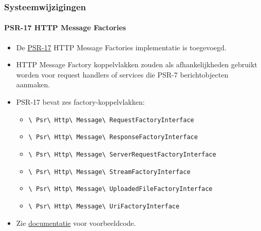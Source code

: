 
\begin{frame}[fragile]
	\frametitle{Systeemwijzigingen}
	\framesubtitle{PSR-17 HTTP Message Factories}

	\begin{itemize}
		\item De \href{https://www.php-fig.org/psr/psr-17/}{PSR-17}
			HTTP Message Factories implementatie is toegevoegd.
		\item HTTP Message Factory koppelvlakken zouden als afhankelijkheden gebruikt worden voor
			request handlers of services die PSR-7 berichtobjecten aanmaken.
		\item PSR-17 bevat zes factory-koppelvlakken:

			\begin{itemize}\smaller
				\item \texttt{\textbackslash
					Psr\textbackslash
					Http\textbackslash
					Message\textbackslash
					RequestFactoryInterface}
				\item \texttt{\textbackslash
					Psr\textbackslash
					Http\textbackslash
					Message\textbackslash
					ResponseFactoryInterface}
				\item \texttt{\textbackslash
					Psr\textbackslash
					Http\textbackslash
					Message\textbackslash
					ServerRequestFactoryInterface}
				\item \texttt{\textbackslash
					Psr\textbackslash
					Http\textbackslash
					Message\textbackslash
					StreamFactoryInterface}
				\item \texttt{\textbackslash
					Psr\textbackslash
					Http\textbackslash
					Message\textbackslash
					UploadedFileFactoryInterface}
				\item \texttt{\textbackslash
					Psr\textbackslash
					Http\textbackslash
					Message\textbackslash
					UriFactoryInterface}

			\end{itemize}\normalsize

		\item Zie
			\href{https://docs.typo3.org/c/typo3/cms-core/master/en-us/Changelog/10.1/Feature-89018-ProvideImplementationForPSR-17HTTPMessageFactories.html}{documentatie}
			voor voorbeeldcode.

	\end{itemize}

\end{frame}

